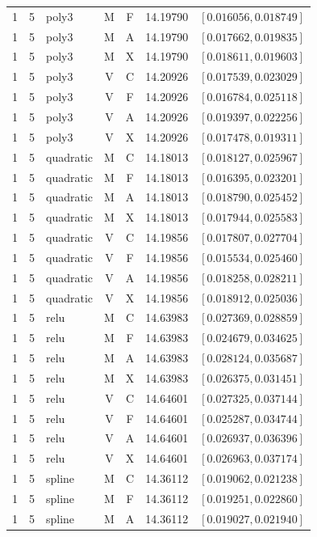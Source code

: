 \begin{longtable}{r r l c c r l}
1 & 5 & poly3 & M & F & 14.19790 & $[0.016056,0.018749]$ \\
1 & 5 & poly3 & M & A & 14.19790 & $[0.017662,0.019835]$ \\
1 & 5 & poly3 & M & X & 14.19790 & $[0.018611,0.019603]$ \\
1 & 5 & poly3 & V & C & 14.20926 & $[0.017539,0.023029]$ \\
1 & 5 & poly3 & V & F & 14.20926 & $[0.016784,0.025118]$ \\
1 & 5 & poly3 & V & A & 14.20926 & $[0.019397,0.022256]$ \\
1 & 5 & poly3 & V & X & 14.20926 & $[0.017478,0.019311]$ \\
1 & 5 & quadratic & M & C & 14.18013 & $[0.018127,0.025967]$ \\
1 & 5 & quadratic & M & F & 14.18013 & $[0.016395,0.023201]$ \\
1 & 5 & quadratic & M & A & 14.18013 & $[0.018790,0.025452]$ \\
1 & 5 & quadratic & M & X & 14.18013 & $[0.017944,0.025583]$ \\
1 & 5 & quadratic & V & C & 14.19856 & $[0.017807,0.027704]$ \\
1 & 5 & quadratic & V & F & 14.19856 & $[0.015534,0.025460]$ \\
1 & 5 & quadratic & V & A & 14.19856 & $[0.018258,0.028211]$ \\
1 & 5 & quadratic & V & X & 14.19856 & $[0.018912,0.025036]$ \\
1 & 5 & relu & M & C & 14.63983 & $[0.027369,0.028859]$ \\
1 & 5 & relu & M & F & 14.63983 & $[0.024679,0.034625]$ \\
1 & 5 & relu & M & A & 14.63983 & $[0.028124,0.035687]$ \\
1 & 5 & relu & M & X & 14.63983 & $[0.026375,0.031451]$ \\
1 & 5 & relu & V & C & 14.64601 & $[0.027325,0.037144]$ \\
1 & 5 & relu & V & F & 14.64601 & $[0.025287,0.034744]$ \\
1 & 5 & relu & V & A & 14.64601 & $[0.026937,0.036396]$ \\
1 & 5 & relu & V & X & 14.64601 & $[0.026963,0.037174]$ \\
1 & 5 & spline & M & C & 14.36112 & $[0.019062,0.021238]$ \\
1 & 5 & spline & M & F & 14.36112 & $[0.019251,0.022860]$ \\
1 & 5 & spline & M & A & 14.36112 & $[0.019027,0.021940]$ \\

\end{longtable}

